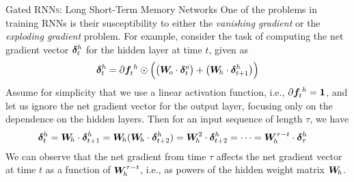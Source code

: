 \ifdefined\wox \begin{frame} \titlepage \end{frame} \fi



\begin{frame}{Gated RNN\textsc{s}: Long Short-Term Memory Networks}
%
One of the problems in training RNNs is their susceptibility 
to either the {\em vanishing gradient} or the {\em exploding gradient} problem. For example,
consider the task of computing the net gradient vector ${\bm \delta}_t^h$ for
the hidden layer at time $t$, given as
\begin{align*}
    {\bm \delta}_t^h = \partial{\boldsymbol f}^{\;h}_t \odot \Bigl(\bigl({\boldsymbol W}_{\!o} \cdot
        {\bm \delta}_t^o \bigr) + \bigl({\boldsymbol W}_{\!h} \cdot {\bm \delta}_{t+1}^h
    \bigr) \Bigr)
\end{align*}
Assume for simplicity that we use a linear
activation function, i.e., $\partial {\boldsymbol f}^{\;h}_t = \mathbf{1}$, 
and let us ignore the net gradient vector for the
output layer, focusing only on the dependence on the hidden layers.
Then for an input sequence of
length $\tau$, we have
\begin{align*}
    {\bm \delta}_t^h & = {\boldsymbol W}_{\!h} \cdot {\bm \delta}_{t+1}^h
     = {\boldsymbol W}_{\!h} ({\boldsymbol W}_{\!h} \cdot {\bm \delta}_{t+2}^h) = {\boldsymbol W}_{\!h}^2 \cdot
    {\bm \delta}_{t+2}^h
    = \cdots = {\boldsymbol W}_{\!h}^{\tau-t} \cdot {\bm \delta}_{\tau}^h
\end{align*}
We can observe that the net gradient from time $\tau$ affects the
net gradient vector at time $t$ as a function of ${\boldsymbol W}_{\!h}^{\tau-t}$,
i.e., as powers of the hidden weight matrix ${\boldsymbol W}_{\!h}$. 
\end{frame}

